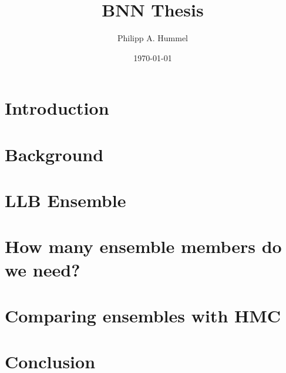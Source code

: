 \documentclass[12pt, A4, twoside]{report}
\title{BNN Thesis}
\author{Philipp A. Hummel}
\date{\today}
\begin{document}
\begin{titlepage}
\maketitle
\end{titlepage}


\begin{abstract}

\end{abstract}


\tableofcontents


\chapter{Introduction}




\chapter{Background}




\chapter{LLB Ensemble}




\chapter{How many ensemble members do we need?}




\chapter{Comparing ensembles with HMC}




\chapter{Conclusion}

\end{document}
